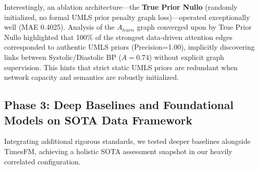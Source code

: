\begin{table}[h]
\centering
\caption{Final Consolidated Benchmark (17 Features, Parallel Architecture)}
\label{tab:final_benchmark}
\end{table}

Interestingly, an ablation architecture---the \textbf{True Prior Nullo} (randomly initialized, no formal UMLS prior penalty graph loss)---operated exceptionally well (MAE 0.4025). Analysis of the $A_{learn}$ graph converged upon by True Prior Nullo highlighted that 100\% of the strongest data-driven attention edges corresponded to authentic UMLS priors (Precision=1.00), implicitly discovering links between Systolic/Diastolic BP ($A=0.74$) without explicit graph supervision. This hints that strict static UMLS priors are redundant when network capacity and semantics are robustly initialized.

\subsection{Phase 3: Deep Baselines and Foundational Models on SOTA Data Framework}
Integrating additional rigorous standards, we tested deeper baselines alongside TimesFM, achieving a holistic SOTA assessment snapshot in our heavily correlated configuration.

